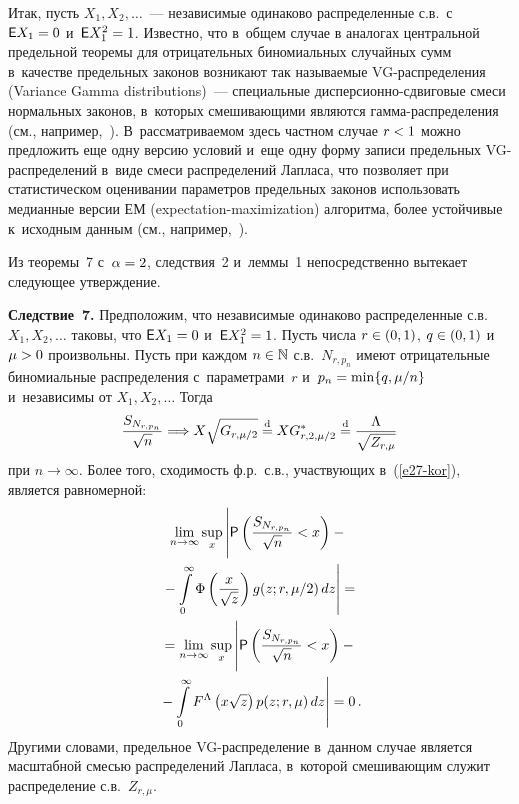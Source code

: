 \begin{multicols}{2}
Итак, пусть $X_1,X_2,\ldots$~--- независимые одинаково распределенные с.в.\
 с~${\sf E}X_1\hm=0$ и~${\sf E}X_1^2\hm=1$. Известно, что в~общем случае
в аналогах центральной предельной теоремы для отрицательных
биномиальных случайных сумм в~качестве предельных законов возникают
так называемые VG-рас\-пре\-де\-ле\-ния (Variance Gamma distributions)~---
специальные дис\-пер\-си\-он\-но-сдви\-го\-вые смеси нормальных законов, 
в~которых смешивающими являются гам\-ма-рас\-пре\-де\-ле\-ния (см., 
например,~\cite{CarrMadanChang1998, Korolev2013}). В~рассматриваемом здесь
частном случае $r\hm<1$ можно предложить еще одну версию условий и~еще
одну форму записи предельных VG-рас\-пре\-де\-ле\-ний в~виде смеси
распределений Лапласа, что позволяет при статистическом оценивании
параметров предельных законов использовать медианные версии
ЕМ (expectation-maximization) ал\-го\-рит\-ма, более устойчивые к~исходным данным (см., например,~\cite{KGT2008}).

Из теоремы~7 с~$\alpha\hm=2$, следствия~2 и~леммы~1 непосредственно
вытекает следующее утверждение.

\smallskip

\noindent
\textbf{Следствие~7.} Предположим, что независимые одинаково
распределенные с.в.~$X_1,X_2,\ldots$ таковы, что ${\sf E}X_1\hm=0$ 
и~${\sf E}X_1^2\hm=1$. Пусть числа $r\hm\in(0,1)$, $q\hm\in(0,1)$ и~$\mu\hm>0$
произвольны. Пусть при каждом $n\hm\in\mathbb{N}$ с.в.~$N_{r,p_n}$
имеют отрицательные биномиальные распределения с~параметрами~$r$ 
и~$p_n\hm=\min\{q,\mu/n\}$ и~независимы от $X_1,X_2,\ldots$ Тогда
\begin{equation}
\displaystyle\frac{\displaystyle S_{N_{r,p_n}}\mathstrut}{\displaystyle \sqrt{n}\mathstrut}\Longrightarrow
X \sqrt{G_{r,\mu/2}}\stackrel{\mathrm{d}}{=} X  G^*_{r,2,\mu/2}\stackrel{\mathrm{d}}{=}
\displaystyle\frac{\displaystyle \Lambda\mathstrut}{\displaystyle \sqrt{Z_{r,\mu}}\mathstrut}\label{e27-kor}
\end{equation}
при $n\to\infty$. Более того, сходимость ф.р.\ с.в., участвующих в~(\ref{e27-kor}), 
является равномерной:
\begin{multline*}
\lim\limits_{n\to\infty}\sup\limits_x\left\vert
\vphantom{\int\limits_{0}^{\infty}}
 {\sf P}
\left(\fr{S_{N_{r,p_n}}}{\sqrt{n}}<x\right)
-{}\right.\\
\left.{}-\int\limits_{0}^{\infty}\Phi\left(\fr{x}{\sqrt{z}}\right)g(z;r,\mu/2)\,dz\right\vert={}
\\
{}=\lim\limits_{n\to\infty}\sup\limits_x\left\vert
\vphantom{\int\limits_{0}^{\infty}}
{\sf P}
\left(\fr{S_{N_{r,p_n}}}{\sqrt{n}}<x\right)
-{}\right.\\
\left.{}-\int\limits_{0}^{\infty}F^{\Lambda}\left(x\sqrt{z}\right)p(z;r,\mu)\,dz
\right\vert=0\,.
\end{multline*}
Другими словами, предельное VG-рас\-пре\-де\-ле\-ние в~данном случае
является масштабной смесью распределений Лапласа, в~которой
смешивающим служит распределение с.в.~$Z_{r,\mu}$.


\end{multicols}

